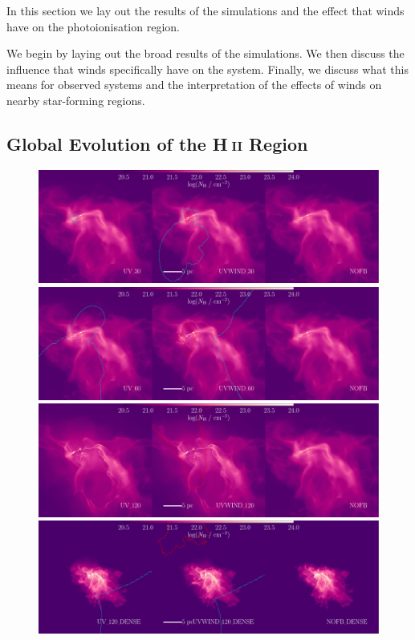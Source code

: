 \documentclass[a4paper,fleqn,usenatbib]{mnras}
\newcommand{\HII}{H$~$\textsc{ii}\xspace}
\begin{document}
In this section we lay out the results of the simulations and the effect that winds have on the photoionisation region.

We begin by laying out the broad results of the simulations. We then discuss the influence that winds specifically have on the system. Finally, we discuss what this means for observed systems and the interpretation of the effects of winds on nearby star-forming regions.

\subsection{Global Evolution of the \HII Region}
\label{results:global}

\begin{figure}
	\includegraphics[width=1.9\columnwidth]{../plots/vis/multiray/multirayTime_NH_windset_30Msun0p2Myr_zoom0p25__y.pdf}
	\includegraphics[width=1.9\columnwidth]{../plots/vis/multiray/multirayTime_NH_windset_60Msun0p2Myr_zoom0p25__y.pdf}
	\includegraphics[width=1.9\columnwidth]{../plots/vis/multiray/multirayTime_NH_windset_120Msun0p2Myr_zoom0p25__y.pdf}
	\includegraphics[width=1.9\columnwidth]{../plots/vis/multiray/multirayTime_NH_windset_120Msun_dense0p2Myr_zoom1p0__y.pdf}

\end{figure}
\end{document}
